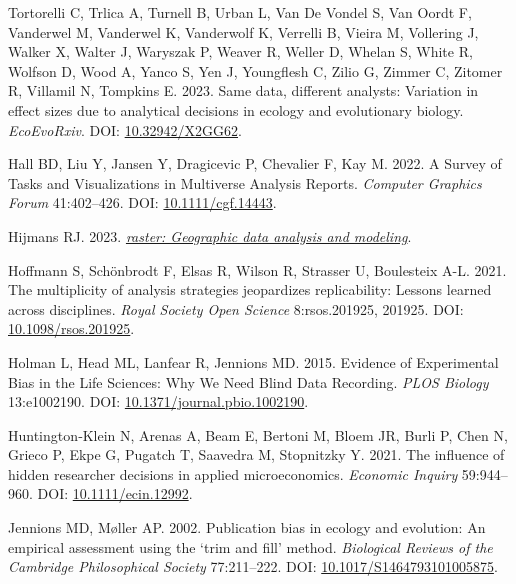 \documentclass[10pt,a4paper]{article}
\newlength{\cslhangindent}
\newlength{\cslentryspacingunit} %
\newenvironment{CSLReferences}[2] %
 {%
  \setlength{\parindent}{0pt}
  \ifodd #1
  \let\oldpar\par
  \def\par{\hangindent=\cslhangindent\oldpar}
  \fi
  \setlength{\parskip}{#2\cslentryspacingunit}
 }%
 {}
\begin{document}
\begin{CSLReferences}{1}{0}
Tortorelli C, Trlica A, Turnell B, Urban L, Van De Vondel S, Van Oordt F, Vanderwel M, Vanderwel K, Vanderwolf K, Verrelli B, Vieira M, Vollering J, Walker X, Walter J, Waryszak P, Weaver R, Weller D, Whelan S, White R, Wolfson D, Wood A, Yanco S, Yen J, Youngflesh C, Zilio G, Zimmer C, Zitomer R, Villamil N, Tompkins E. 2023. Same data, different analysts: Variation in effect sizes due to analytical decisions in ecology and evolutionary biology. \emph{EcoEvoRxiv}. DOI: \href{https://doi.org/10.32942/X2GG62}{10.32942/X2GG62}.

\leavevmode{}%
Hall BD, Liu Y, Jansen Y, Dragicevic P, Chevalier F, Kay M. 2022. A {Survey} of {Tasks} and {Visualizations} in {Multiverse} {Analysis} {Reports}. \emph{Computer Graphics Forum} 41:402--426. DOI: \href{https://doi.org/10.1111/cgf.14443}{10.1111/cgf.14443}.

\leavevmode{}%
Hijmans RJ. 2023. \emph{\href{https://CRAN.R-project.org/package=raster}{{raster}: Geographic data analysis and modeling}}.

\leavevmode{}%
Hoffmann S, Schönbrodt F, Elsas R, Wilson R, Strasser U, Boulesteix A-L. 2021. The multiplicity of analysis strategies jeopardizes replicability: Lessons learned across disciplines. \emph{Royal Society Open Science} 8:rsos.201925, 201925. DOI: \href{https://doi.org/10.1098/rsos.201925}{10.1098/rsos.201925}.

\leavevmode{}%
Holman L, Head ML, Lanfear R, Jennions MD. 2015. Evidence of {Experimental} {Bias} in the {Life} {Sciences}: {Why} {We} {Need} {Blind} {Data} {Recording}. \emph{PLOS Biology} 13:e1002190. DOI: \href{https://doi.org/10.1371/journal.pbio.1002190}{10.1371/journal.pbio.1002190}.

\leavevmode{}%
Huntington‐Klein N, Arenas A, Beam E, Bertoni M, Bloem JR, Burli P, Chen N, Grieco P, Ekpe G, Pugatch T, Saavedra M, Stopnitzky Y. 2021. The influence of hidden researcher decisions in applied microeconomics. \emph{Economic Inquiry} 59:944--960. DOI: \href{https://doi.org/10.1111/ecin.12992}{10.1111/ecin.12992}.

\leavevmode{}%
Jennions MD, Møller AP. 2002. Publication bias in ecology and evolution: An empirical assessment using the `trim and fill' method. \emph{Biological Reviews of the Cambridge Philosophical Society} 77:211--222. DOI: \href{https://doi.org/10.1017/S1464793101005875}{10.1017/S1464793101005875}.


\end{CSLReferences}
\end{document}
